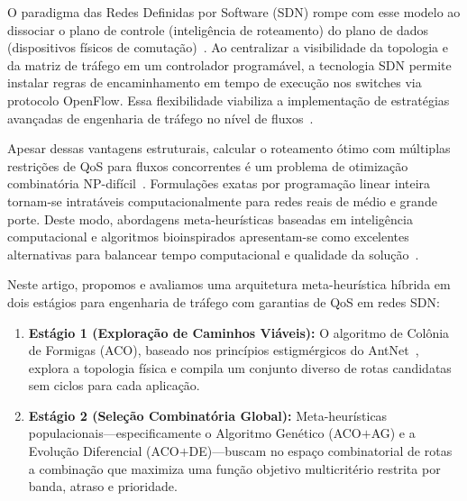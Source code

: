 \documentclass[journal]{IEEEtran}
\begin{document}
O paradigma das Redes Definidas por Software (SDN) rompe com esse modelo ao dissociar o plano de controle (intelig\^{e}ncia de roteamento) do plano de dados (dispositivos f\'{i}sicos de comuta\c{c}\~{a}o)~\cite{mckeown2008openflow, nunes2014survey}. Ao centralizar a visibilidade da topologia e da matriz de tr\'{a}fego em um controlador program\'{a}vel, a tecnologia SDN permite instalar regras de encaminhamento em tempo de execu\c{c}\~{a}o nos switches via protocolo OpenFlow. Essa flexibilidade viabiliza a implementa\c{c}\~{a}o de estrat\'{e}gias avan\c{c}adas de engenharia de tr\'{a}fego no n\'{i}vel de fluxos~\cite{kim2013improving, jain2013b4, hong2013achieving, agarwal2013traffic}.

Apesar dessas vantagens estruturais, calcular o roteamento \'{o}timo com m\'{u}ltiplas restri\c{c}\~{o}es de QoS para fluxos concorrentes \'{e} um problema de otimiza\c{c}\~{a}o combinat\'{o}ria NP-dif\'{i}cil~\cite{korkmaz2001multiconstrained, lin2022survey}. Formula\c{c}\~{o}es exatas por programa\c{c}\~{a}o linear inteira tornam-se intrat\'{a}veis computacionalmente para redes reais de m\'{e}dio e grande porte. Deste modo, abordagens meta-heur\'{i}sticas baseadas em intelig\^{e}ncia computacional e algoritmos bioinspirados apresentam-se como excelentes alternativas para balancear tempo computacional e qualidade da solu\c{c}\~{a}o~\cite{dorigo2004ant, goldberg1989genetic, storn1997differential, alsadi2021qos}.

Neste artigo, propomos e avaliamos uma arquitetura meta-heur\'{i}stica h\'{i}brida em dois est\'{a}gios para engenharia de tr\'{a}fego com garantias de QoS em redes SDN:
\begin{enumerate}
    \item \textbf{Est\'{a}gio 1 (Explora\c{c}\~{a}o de Caminhos Vi\'{a}veis):} O algoritmo de Col\^{o}nia de Formigas (ACO), baseado nos princ\'{i}pios estigm\'{e}rgicos do AntNet~\cite{dicaro1998antnet}, explora a topologia f\'{i}sica e compila um conjunto diverso de rotas candidatas sem ciclos para cada aplica\c{c}\~{a}o.
    \item \textbf{Est\'{a}gio 2 (Sele\c{c}\~{a}o Combinat\'{o}ria Global):} Meta-heur\'{i}sticas populacionais---especificamente o Algoritmo Gen\'{e}tico (ACO$+$AG) e a Evolu\c{c}\~{a}o Diferencial (ACO$+$DE)---buscam no espa\c{c}o combinatorial de rotas a combina\c{c}\~{a}o que maximiza uma fun\c{c}\~{a}o objetivo multicrit\'{e}rio restrita por banda, atraso e prioridade.
\end{enumerate}
\end{document}
